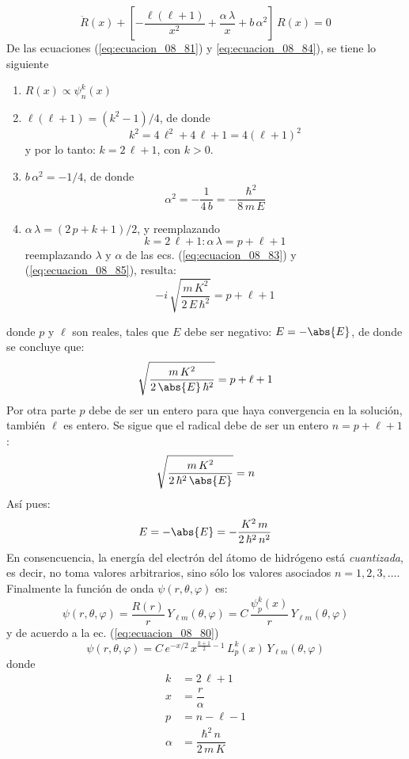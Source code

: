 \begin{equation}
\ddot{R} (x) + \left[ - \dfrac{\ell (\ell + 1)}{x^{2}} + \dfrac{\alpha \, \lambda}{x} + b \, \alpha^{2} \right] \, R (x) = 0
\label{eq:ecuacion_08_84}
\end{equation}
De las ecuaciones (\ref{eq:ecuacion_08_81}) y \ref{eq:ecuacion_08_84}), se tiene lo siguiente
\begin{enumerate}[label=\roman*.)]
\item $R(x) \propto \psi_{n}^{k} (x)$
\item $\ell (\ell + 1) = (k^{2} - 1)/4$, de donde
\[ k^{2} = 4 \, \ell^{2} + 4 \, \ell + 1 = 4 (\ell + 1)^{2} \]
y por lo tanto: $k = 2 \, \ell + 1$, con $k > 0$.
\item $b \,\alpha^{2} = - 1/4$, de donde
\begin{equation}
\alpha^{2} =  - \dfrac{1}{4 \, b} = - \dfrac{\hbar^{2}}{8 \, m \, E}
\label{eq:ecuacion_08_85}
\end{equation}
\item $\alpha \, \lambda = (2 \, p + k + 1)/2$, y reemplazando 
\[ k =  2 \, \ell + 1 : \alpha \, \lambda = p + \ell +1 \]
reemplazando $\lambda$ y $\alpha$ de las ecs. (\ref{eq:ecuacion_08_83}) y (\ref{eq:ecuacion_08_85}), resulta:
\[- i \, \sqrt{\dfrac{m \, K^{2}}{2 \, E \, \hbar^{2}}} = p + \ell + 1 \]
\end{enumerate}
donde $p$ y $\ell$ son reales, tales que $E$ debe ser negativo: $E = - \abs{E}$, de donde se concluye que:
\[ \sqrt{\dfrac{m \, K^{2}}{2 \, \abs{E} \, \hbar^{2}}} = p + \ell + 1 \]
Por otra parte $p$ debe de ser un entero para que haya convergencia en la solución, también $\ell$ es entero. Se sigue que el radical debe de ser un entero $n = p + \ell + 1$:
\[ \sqrt{\dfrac{m \, K^{2}}{2 \, \hbar^{2} \, \abs{E}}} = n \]
Así pues:
\[ E = - \abs{E} = - \dfrac{K^{2} \, m}{2 \, \hbar^{2} \, n^{2}} \]
En consencuencia, la energía del electrón del átomo de hidrógeno está \emph{cuantizada}, es decir, no toma valores arbitrarios, sino sólo los valores asociados $n = 1, 2, 3, \ldots$. Finalmente la función de onda $\psi (r, \theta, \varphi)$ es:
\[ \psi (r, \theta, \varphi) =  \dfrac{R(r)}{r} \, Y_{\ell m} (\theta, \varphi) = C \, \dfrac{\psi_{p}^{k} (x)}{r} \, Y_{\ell m} (\theta, \varphi) \]
y de acuerdo a la ec. (\ref{eq:ecuacion_08_80})
\[ \psi (r, \theta, \varphi) = C \, e^{-x/2} \, x^{\frac{k+1}{2} - 1} \, L_{p}^{k} (x) \, Y_{\ell m} (\theta, \varphi) \]
donde
\begin{align*}
k &= 2 \, \ell + 1 \\
x &= \dfrac{r}{\alpha} \\
p &= n - \ell - 1 \\
\alpha &= \dfrac{\hbar^{2} \, n}{2 \, m \, K} 
\end{align*}
